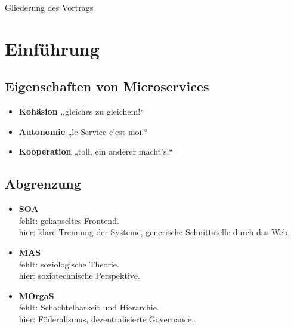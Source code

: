 \documentclass{beamer}
\date{16. Januar 2016}
\def\tocname{Gliederung des Vortrags}
\begin{document}
\fontsize{14pt}{14pt}
	
{
\begin{frame}%
	\titlepage
\end{frame}}

\begin{frame}{\tocname}
	\tableofcontents
\end{frame}

\section{Einführung}

\subsection{Eigenschaften von Microservices}
\begin{frame}{\insertsubsection}
	\begin{itemize}
		\item \textbf{Kohäsion} „gleiches zu gleichem!“
		\item \textbf{Autonomie} „le Service c'est moi!“
		\item \textbf{Kooperation} „toll, ein anderer macht's!“
	\end{itemize}
\end{frame}

\subsection{Abgrenzung}
\begin{frame}{\insertsubsection}
	\begin{itemize}
		\item \textbf{SOA}\\
		fehlt: gekapseltes Frontend.\\
		hier: klare Trennung der Systeme, generische Schnittstelle durch das Web.
		
		\item \textbf{MAS}\\
		fehlt: soziologische Theorie.\\
		hier: soziotechnische Perspektive.
		
		\item \textbf{MOrgaS} \cite{Wester-Ebbinghaus10} \\
		fehlt: Schachtelbarkeit und Hierarchie.\\
		hier: Föderalismus, dezentralisierte Governance.
	\end{itemize}
\end{frame}
\end{document}
